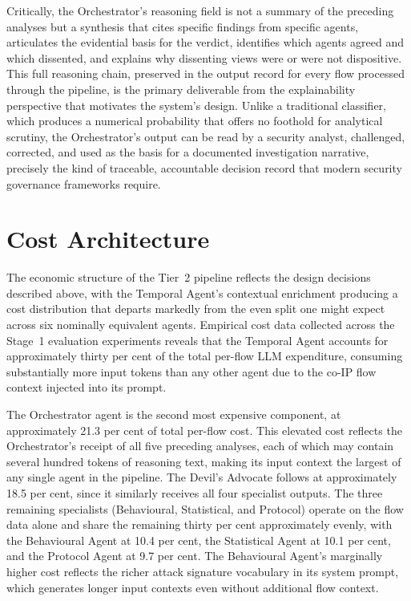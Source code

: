 Critically, the Orchestrator's reasoning field is not a summary of the preceding analyses but a synthesis that cites specific findings from specific agents, articulates the evidential basis for the verdict, identifies which agents agreed and which dissented, and explains why dissenting views were or were not dispositive. This full reasoning chain, preserved in the output record for every flow processed through the pipeline, is the primary deliverable from the explainability perspective that motivates the system's design. Unlike a traditional classifier, which produces a numerical probability that offers no foothold for analytical scrutiny, the Orchestrator's output can be read by a security analyst, challenged, corrected, and used as the basis for a documented investigation narrative, precisely the kind of traceable, accountable decision record that modern security governance frameworks require.

\section{Cost Architecture}
\label{sec:cost-architecture}

The economic structure of the Tier~2 pipeline reflects the design decisions described above, with the Temporal Agent's contextual enrichment producing a cost distribution that departs markedly from the even split one might expect across six nominally equivalent agents. Empirical cost data collected across the Stage~1 evaluation experiments reveals that the Temporal Agent accounts for approximately thirty per cent of the total per-flow LLM expenditure, consuming substantially more input tokens than any other agent due to the co-IP flow context injected into its prompt.

The Orchestrator agent is the second most expensive component, at approximately 21.3 per cent of total per-flow cost. This elevated cost reflects the Orchestrator's receipt of all five preceding analyses, each of which may contain several hundred tokens of reasoning text, making its input context the largest of any single agent in the pipeline. The Devil's Advocate follows at approximately 18.5 per cent, since it similarly receives all four specialist outputs. The three remaining specialists (Behavioural, Statistical, and Protocol) operate on the flow data alone and share the remaining thirty per cent approximately evenly, with the Behavioural Agent at 10.4 per cent, the Statistical Agent at 10.1 per cent, and the Protocol Agent at 9.7 per cent. The Behavioural Agent's marginally higher cost reflects the richer attack signature vocabulary in its system prompt, which generates longer input contexts even without additional flow context.

